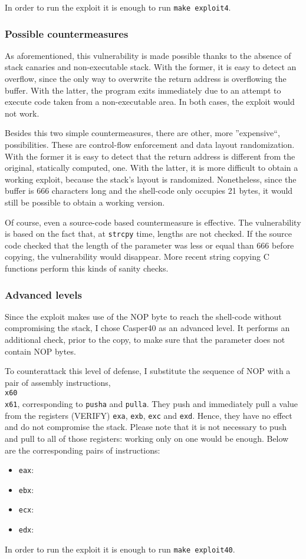 In order to run the exploit it is enough to run \texttt{make exploit4}.

\subsubsection{Possible countermeasures}
As aforementioned, this vulnerability is made possible thanks to the absence of stack canaries and non-executable stack. With the former, it is easy to detect an overflow, since the only way to overwrite the return address is overflowing the buffer. With the latter, the program exits immediately due to an attempt to execute code taken from a non-executable area. In both cases, the exploit would not work. 

Besides this two simple countermeasures, there are other, more ''expensive``, possibilities. These are control-flow enforcement and data layout randomization. With the former it is easy to detect that the return address is different from the original, statically computed, one. With the latter, it is more difficult to obtain a working exploit, because the stack's layout is randomized. Nonetheless, since the buffer is 666 characters long and the shell-code only occupies 21 bytes, it would still be possible to obtain a working version.

Of course, even a source-code based countermeasure is effective. The vulnerability is based on the fact that, at \texttt{strcpy} time, lengths are not checked. If the source code checked that the length of the parameter was less or equal than 666 before copying, the vulnerability would disappear. More recent string copying C functions perform this kinds of sanity checks.

\subsubsection{Advanced levels}
Since the exploit makes use of the NOP byte to reach the shell-code without compromising the stack, I chose Casper40 as an advanced level. It performs an additional check, prior to the copy, to make sure that the parameter does not contain NOP bytes. 

To counterattack this level of defense, I substitute the sequence of NOP with a pair of assembly instructions, \texttt{\\x60\\x61}, corresponding to \texttt{pusha} and \texttt{pulla}. They push and immediately pull a value from the registers (VERIFY) \texttt{exa}, \texttt{exb}, \texttt{exc} and \texttt{exd}. Hence, they have no effect and do not compromise the stack. Please note that it is not necessary to push and pull to all of those registers: working only on one would be enough. Below are the corresponding pairs of instructions:
\begin{itemize}
	\item \texttt{eax}: 
	\item \texttt{ebx}: 
	\item \texttt{ecx}: 
	\item \texttt{edx}: 
\end{itemize}


In order to run the exploit it is enough to run \texttt{make exploit40}.

